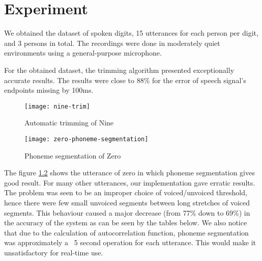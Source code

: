 \chapter{Experiment} \label{ch:experiment}

We obtained the dataset of spoken digits, 15 utterances for each person per digit, and 3 persons in total. The recordings were done in moderately quiet environments using a general-purpose microphone.

For the obtained dataset, the trimming algorithm presented exceptionally accurate results. The results were close to 88\% for the error of speech signal's endpoints missing by 100ms.

\begin{figure}
    \centering
    \texttt{[image: nine-trim]}
    \label{fig:nine-trim}
    \caption{Automatic trimming of Nine}
\end{figure}

\begin{minipage}{0.6\textwidth}
    \begin{figure}[H]
        \texttt{[image: zero-phoneme-segmentation]}
        \caption{Phoneme segmentation of Zero}
        \label{fig:zero-phoneme-segementation}
    \end{figure}
    \end{minipage} \hfill
    \begin{minipage}{0.5\textwidth}
        The figure \ref{fig:zero-phoneme-segementation} shows the utterance of zero in which phoneme segmentation gives good result. For many other utterances, our implementation gave erratic results. The problem was seen to be an improper choice of voiced/unvoiced threshold, hence there were few small unvoiced segments between long stretches of voiced segments. This behaviour caused a major decrease (from 77\% down to 69\%) in the accuracy of the system as can be seen by the tables below.
        We also notice that due to the calculation of autocorrelation function, phoneme segmentation was approximately a ~5 second operation for each utterance. This would make it unsatisfactory for real-time use.
\end{minipage}

